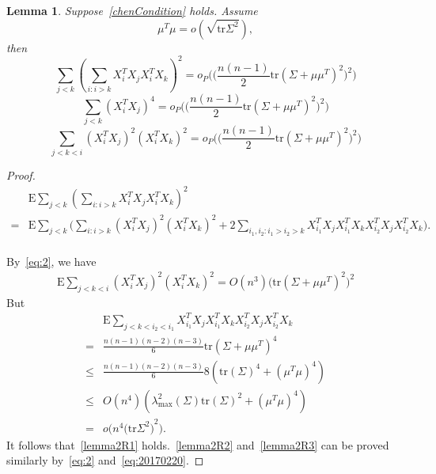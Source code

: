 \documentclass[review]{elsarticle}
\theoremstyle{plain}
\newtheorem{lemma}{Lemma}
\theoremstyle{definition}
\theoremstyle{remark}
\begin{document}
\begin{lemma}
    Suppose~\eqref{chenCondition} holds. Assume
    \begin{equation} 
        \mu^T \mu=o(\sqrt{\mathrm{tr}\Sigma^2}),
    \end{equation}
then
    \begin{equation}\label{lemma2R1}
        \sum_{j<k}{(\sum_{i:i>k}X_i^T X_j X_i^T X_k)}^2
        =o_P\Big(\big(\frac{n(n-1)}{2}\mathrm{tr}(\Sigma+\mu\mu^T)^2\big)^2\Big)
    \end{equation}
    \begin{equation}\label{lemma2R2}
        \sum_{j<k}{(X_i^T X_j)}^4=o_P\Big(\big(\frac{n(n-1)}{2}\mathrm{tr}(\Sigma+\mu\mu^T)^2\big)^2\Big)
    \end{equation}
    \begin{equation}\label{lemma2R3}
        \sum_{j<k<i}{(X_i^T X_j)}^2{(X_i^T X_k)}^2 =o_P\Big(\big(\frac{n(n-1)}{2}\mathrm{tr}(\Sigma+\mu\mu^T)^2\big)^2\Big)
    \end{equation}
\end{lemma}
\begin{proof}
    \begin{equation}
    \begin{aligned}
        &\mathrm{E}\sum_{j<k}{(\sum_{i:i>k}X_i^T X_j X_i^T X_k)}^2\\
        =&
        \mathrm{E}\sum_{j<k}\Big(\sum_{i:i>k}(X_i^T X_j)^2 (X_i^T X_k)^2+2\sum_{i_1,i_2:i_1>i_2>k}X_{i_1}^T X_j X_{i_1}^T X_k X_{i_2}^T X_j X_{i_2}^T X_k\Big).\\
    \end{aligned}
    \end{equation}

    By~\eqref{eq:2}, we have
    \begin{equation}
    \begin{aligned}
        \mathrm{E}\sum_{j<k<i}(X_i^T X_j)^2 (X_i^T X_k)^2    =O(n^3)\big(\mathrm{tr}(\Sigma+\mu\mu^T)^2\big)^2
    \end{aligned}
    \end{equation}
    But
    \begin{equation}
    \begin{aligned}
        &\mathrm{E}\sum_{j<k<i_2<i_1}X_{i_1}^T X_j X_{i_1}^T X_k X_{i_2}^T X_j X_{i_2}^T X_k\\
        =&\frac{n(n-1)(n-2)(n-3)}{6}\mathrm{tr}{(\Sigma+\mu\mu^T)}^4\\
        \leq& \frac{n(n-1)(n-2)(n-3)}{6}8(\mathrm{tr}{(\Sigma)}^4+(\mu^T \mu)^4)\\
        \leq& O(n^4)(\lambda_{\max}^2(\Sigma)\mathrm{tr}{(\Sigma)}^2+(\mu^T \mu)^4)\\
        =&
        o\Big(n^4{\big(\mathrm{tr}\Sigma^2\big)}^2\Big).
    \end{aligned}
    \end{equation}
    It follows that~\eqref{lemma2R1} holds.~\eqref{lemma2R2} and~\eqref{lemma2R3} can be proved similarly by~\eqref{eq:2} and~\eqref{eq:20170220}.

\end{proof}
\end{document}
